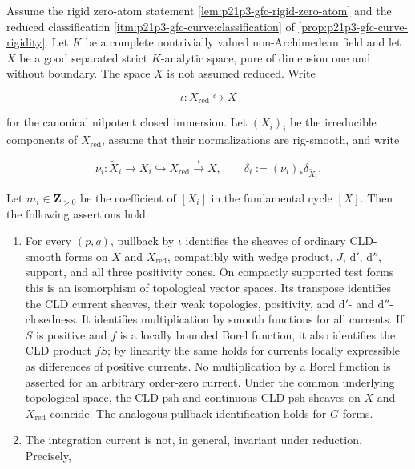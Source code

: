 \begin{proposition}
\label{prop:p21p3-gfnr-curve-rigidity}
Assume the rigid zero-atom statement
\cref{lem:p21p3-gfc-rigid-zero-atom} and the reduced classification
\cref{itm:p21p3-gfc-curve:classification} of
\cref{prop:p21p3-gfc-curve-rigidity}.  Let \(K\) be a complete
nontrivially valued non-Archimedean field and let \(X\) be a good separated
strict \(K\)-analytic space, pure of dimension one and without boundary.
The space \(X\) is not assumed reduced.  Write

\[
             \iota:X_{\mathrm{red}}\hookrightarrow X
\]

for the canonical nilpotent closed immersion.  Let \((X_i)_i\) be the
irreducible components of \(X_{\mathrm{red}}\), assume that their
normalizations are rig-smooth, and write

\[
 \nu_i:\widetilde X_i\longrightarrow X_i
       \hookrightarrow X_{\mathrm{red}}\xrightarrow{\iota}X,
 \qquad
 \delta_i:=(\nu_i)_*\delta_{\widetilde X_i}.
\]

Let \(m_i\in\mathbf Z_{>0}\) be the coefficient of \([X_i]\) in the
fundamental cycle \([X]\).  Then the following assertions hold.

\begin{enumerate}
\item\label{itm:p21p3-gfnr:calculus}
For every \((p,q)\), pullback by \(\iota\) identifies the sheaves of
ordinary CLD-smooth forms on \(X\) and \(X_{\mathrm{red}}\), compatibly
with wedge product, \(J\), \(\mathrm d'\), \(\mathrm d''\), support, and all
three positivity cones.  On compactly supported test forms this is an
isomorphism of topological vector spaces.  Its transpose identifies the
CLD current sheaves, their weak topologies, positivity, and
\(\mathrm d'\)- and \(\mathrm d''\)-closedness.  It identifies multiplication
by smooth functions for all currents.  If \(S\) is positive and \(f\) is a
locally bounded Borel function, it also identifies the CLD product \(fS\);
by linearity the same holds for currents locally expressible as differences
of positive currents.  No multiplication by a Borel function is asserted
for an arbitrary order-zero current.  Under the common underlying
topological space, the CLD-psh and continuous CLD-psh sheaves on \(X\) and
\(X_{\mathrm{red}}\) coincide.  The analogous pullback identification
holds for \(G\)-forms.

\item\label{itm:p21p3-gfnr:integration}
The integration current is not, in general, invariant under reduction.
Precisely,


\end{enumerate}
\end{proposition}
